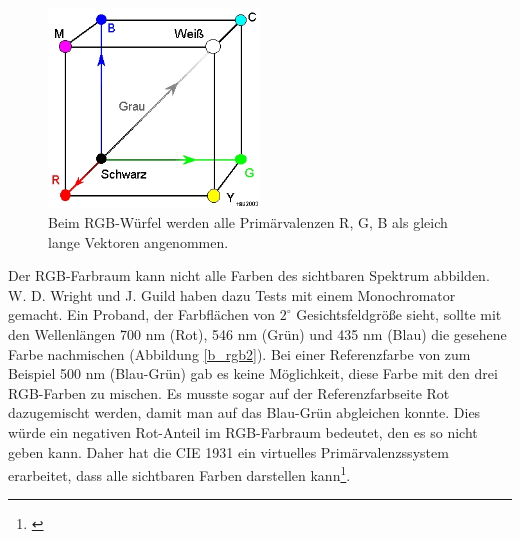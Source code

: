 \begin{figure}[H]     %
\centering
\includegraphics[width=0.5\textwidth]{bilder/rgb1} 
\caption {Beim RGB-Würfel werden alle Primärvalenzen R, G, B als gleich lange Vektoren angenommen\protect\footnotemark .}\label{b_rgb1}
\end{figure}
 
\noindent Der RGB-Farbraum kann nicht alle Farben des sichtbaren Spektrum abbilden. W. D. Wright und J. Guild haben dazu Tests mit einem Monochromator gemacht. Ein Proband, der Farbflächen von $2^\circ$ Gesichtsfeldgröße sieht, sollte mit den Wellenlängen 700 nm (Rot), 546 nm (Grün) und 435 nm (Blau) die gesehene Farbe nachmischen (Abbildung \ref{b_rgb2}). Bei einer Referenzfarbe von zum Beispiel 500 nm (Blau-Grün) gab es keine Möglichkeit, diese Farbe mit den drei RGB-Farben zu mischen. Es musste sogar auf der Referenzfarbseite Rot dazugemischt werden, damit man auf das Blau-Grün abgleichen konnte. Dies würde ein negativen Rot-Anteil im RGB-Farbraum bedeutet, den es so nicht geben kann. Daher hat die CIE 1931 ein virtuelles Primärvalenzssystem erarbeitet, dass alle sichtbaren Farben darstellen kann\footnote{\cite[77]{greule}}.\\

